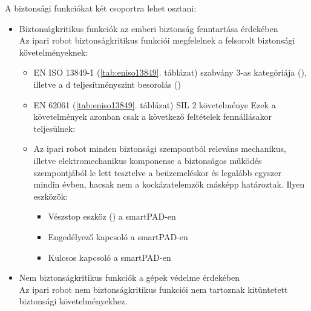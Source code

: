 \documentclass[../documentation.tex]{subfiles}
\begin{document}
A biztonsági funkciókat két csoportra lehet osztani:
\begin{itemize}
	\item Biztonságkritikus funkciók az emberi biztonság fenntartása érdekében\\
	Az ipari robot biztonságkritikus funkciói megfelelnek a felsorolt biztonsági követelményeknek:
	\begin{itemize}
		\item EN ISO 13849-1 (\ref{tab:eniso13849}. táblázat) szabvány 3-as kategóriája (), illetve a d teljesítményszint besorolás ()
		\item EN 62061 (\ref{tab:eniso13849}. táblázat) SIL 2 követelménye
		Ezek a követelmények azonban csak a következő feltételek fennállásakor teljesülnek:
		\item Az ipari robot minden biztonsági szempontból releváns mechanikus, illetve elektromechanikus komponense a biztonságos működés szempontjából le lett tesztelve a beüzemeléskor és legalább egyszer mindin évben, hacsak nem a kockázatelemzők másképp határoztak. Ilyen eszközök:
		\begin{itemize}
			\item Vészstop eszköz () a smartPAD-en
			\item Engedélyező kapcsoló a smartPAD-en
			\item Kulcsos kapcsoló a smartPAD-en
		\end{itemize}
	\end{itemize}
	\item Nem biztonságkritikus funkciók a gépek védelme érdekében\\
	Az ipari robot nem biztonságkritikus funkciói nem tartoznak kitüntetett biztonsági követelményekhez.
\end{itemize}
\end{document}
